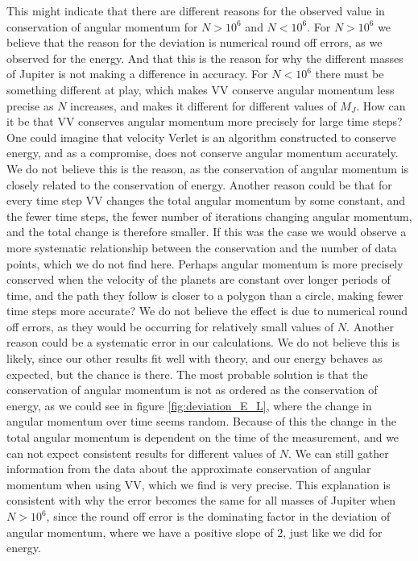 \documentclass[%
 reprint,
nofootinbib,
aps,
]{revtex4-1}
\begin{document}
This might indicate that there are different reasons for the observed value in conservation of angular momentum for $N>10^{6}$ and $N<10^{6}$.
For $N>10^{6}$ we believe that the reason for the deviation is numerical round off errors, as we observed for the energy. And that this is the reason for why the different masses of Jupiter is not making a difference in accuracy. For $N<10^{6}$ there must be something different at play, which makes VV conserve angular momentum less precise as $N$ increases, and makes it different for different values of $M_J$. How can it be that VV conserves angular momentum more precisely for large time steps? One could imagine that velocity Verlet is an algorithm constructed to conserve energy, and as a compromise, does not conserve angular momentum accurately. We do not believe this is the reason, as the conservation of angular momentum is closely related to the conservation of energy. Another reason could be that for every time step VV changes the total angular momentum by some constant, and the fewer time steps, the fewer number of iterations changing angular momentum, and the total change is therefore smaller. If this was the case we would observe a more systematic relationship between the conservation and the number of data points, which we do not find here. Perhaps angular momentum is more precisely conserved when the velocity of the planets are constant over longer periods of time, and the path they follow is closer to a polygon than a circle, making fewer time steps more accurate? We do not believe the effect is due to numerical round off errors, as they would be occurring for relatively small values of $N$. Another reason could be a systematic error in our calculations. We do not believe this is likely, since our other results fit well with theory, and our energy behaves as expected, but the chance is there. The most probable solution is that the conservation of angular momentum is not as ordered as the conservation of energy, as we could see in figure \vref{fig:deviation_E_L}, where the change in angular momentum over time seems random. Because of this the change in the total angular momentum is dependent on the time of the measurement, and we can not expect consistent results for different values of $N$. We can still gather information from the data about the approximate conservation of angular momentum when using VV, which we find is very precise. This explanation is consistent with why the error becomes the same for all masses of Jupiter when $N>10^{6}$, since the round off error is the dominating factor in the deviation of angular momentum, where we have a positive slope of $2$, just like we did for energy.
\end{document}
